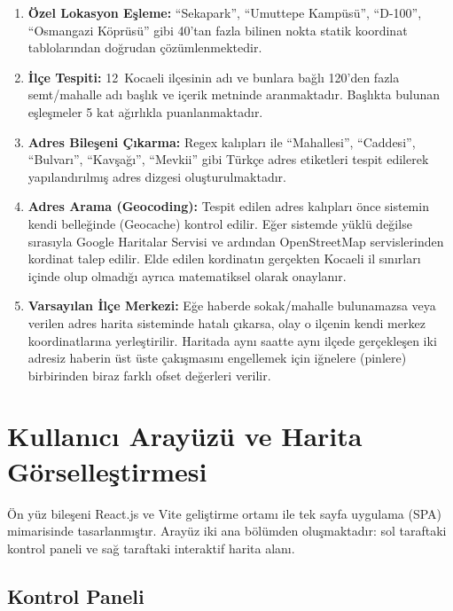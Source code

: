 \documentclass[conference]{IEEEtran}
\begin{document}
    \begin{enumerate}[noitemsep]
    \item \textbf{{\"O}zel Lokasyon E{\c s}leme:} ``Sekapark'', ``Umuttepe Kamp{\"u}s{\"u}'', ``D-100'', ``Osmangazi K{\"o}pr{\"u}s{\"u}'' gibi 40'tan fazla bilinen nokta statik koordinat tablolar{\i}ndan do{\u g}rudan {\c c}{\"o}z{\"u}mlenmektedir.
    \item \textbf{{\.I}l{\c c}e Tespiti:} 12~Kocaeli il{\c c}esinin ad{\i} ve bunlara ba{\u g}l{\i} 120'den fazla semt/mahalle ad{\i} ba{\c s}l{\i}k ve i{\c c}erik metninde aranmaktad{\i}r. Ba{\c s}l{\i}kta bulunan e{\c s}le{\c s}meler 5 kat a{\u g}{\i}rl{\i}kla puanlanmaktad{\i}r.
    \item \textbf{Adres Bile{\c s}eni {\c C}{\i}karma:} Regex kal{\i}plar{\i} ile ``Mahallesi'', ``Caddesi'', ``Bulvar{\i}'', ``Kav{\c s}a{\u g}{\i}'', ``Mevkii'' gibi T{\"u}rk{\c c}e adres etiketleri tespit edilerek yap{\i}land{\i}r{\i}lm{\i}{\c s} adres dizgesi olu{\c s}turulmaktad{\i}r.
    \item \textbf{Adres Arama (Geocoding):} Tespit edilen adres kalıpları önce sistemin kendi belleğinde (Geocache) kontrol edilir. Eğer sistemde yüklü değilse sırasıyla Google Haritalar Servisi ve ardından OpenStreetMap servislerinden kordinat talep edilir. Elde edilen kordinatın gerçekten Kocaeli il sınırları içinde olup olmadığı ayrıca matematiksel olarak onaylanır.
    \item \textbf{Varsay{\i}lan {\.I}l{\c c}e Merkezi:} Eğe haberde sokak/mahalle bulunamazsa veya verilen adres harita sisteminde hatalı çıkarsa, olay o ilçenin kendi merkez koordinatlarına yerleştirilir. Haritada aynı saatte aynı ilçede gerçekleşen iki adresiz haberin üst üste çakışmasını engellemek için iğnelere (pinlere) birbirinden biraz farklı ofset değerleri verilir.
    \end{enumerate}

    \section{Kullan{\i}c{\i} Aray{\"u}z{\"u} ve Harita G{\"o}rselle{\c s}tirmesi}

    {\"O}n y{\"u}z bile{\c s}eni React.js ve Vite geli{\c s}tirme ortam{\i} ile tek sayfa uygulama (SPA) mimarisinde tasarlanm{\i}{\c s}t{\i}r. Aray{\"u}z iki ana b{\"o}l{\"u}mden olu{\c s}maktad{\i}r: sol taraftaki kontrol paneli ve sa{\u g} taraftaki interaktif harita alan{\i}.

    \subsection{Kontrol Paneli}
\end{document}
